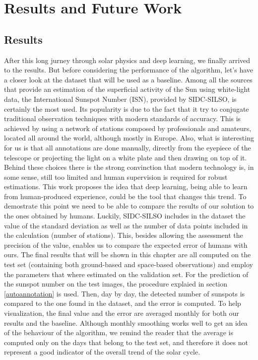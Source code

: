 \chapter{Results and Future Work}
\label{capitolo8}
\thispagestyle{empty}
\section{Results}
After this long jurney through solar physics and deep learning, we finally arrived to the results. But before considering the performance of the algorithm, let's have a closer look at the dataset that will be used as a baseline. Among all the sources that provide an estimation of the superficial activity of the Sun using white-light data, the International Sunspot Number (ISN), provided by SIDC-SILSO, is certainly the most used. Its popularity is due to the fact that it try to conjugate traditional observation techniques with modern standards of accuracy. This is achieved by using a network of stations composed by professionals and amateurs, located all around the world, although mostly in Europe. Also, what is interesting for us is that all annotations are done manually, directly from the eyepiece of the telescope or projecting the light on a white plate and then drawing on top of it.
\bigbreak
\noindent Behind these choices there is the strong convinction that modern technology is, in some sense, still too limited and human supervision is required for robust estimations. This work proposes the idea that deep learning, being able to learn from human-produced experience, could be the tool that changes this trend. To demostrate this point we need to be able to compare the results of our solution to the ones obtained by humans. Luckily, SIDC-SILSO includes in the dataset the value of the standard deviation as well as the number of data points included in the calculation (number of stations). This, besides allowing the assessment the precision of the value, enables us to compare the expected error of humans with ours.
\bigbreak
\noindent The final results that will be shown in this chapter are all computed on the test set (containing both ground-based and space-based observations) and employ the parameters that where estimated on the validation set. For the prediction of the sunspot number on the test images, the procedure explaied in section \ref{autoannotation} is used. Then, day by day, the detected number of sunspots is compared to the one found in the dataset, and the error is computed. To help visualization, the final value and the error are averaged monthly for both our results and the baseline. Although monthly smoothing works well to get an idea of the behaviour of the algorithm, we remind the reader that the average is computed only on the days that belong to the test set, and therefore it does not represent a good indicator of the overall trend of the solar cycle.
